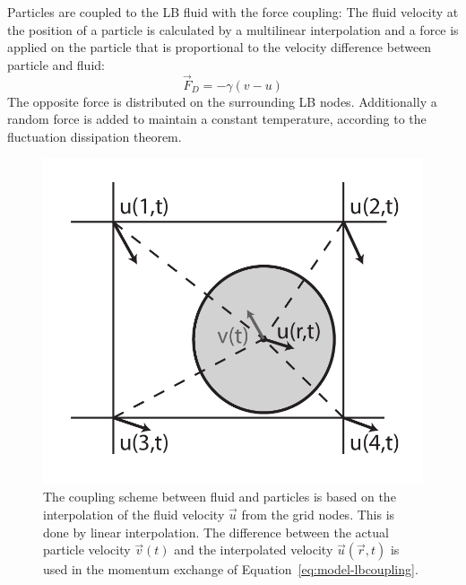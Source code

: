 Particles are coupled to the LB fluid with the force coupling:
The fluid velocity at the position of a particle is calculated 
by a multilinear interpolation and a force is applied on the particle
that is proportional to the velocity difference between particle 
and fluid:
\begin{equation}
  \vec{F}_D = - \gamma \left(v-u\right) 
  \label{eq:model-lbcoupling}
\end{equation}
The opposite force is distributed on the surrounding LB nodes. Additionally
a random force is added to maintain a constant temperature, according
to the fluctuation dissipation theorem. 
\begin{figure}[htp]
\begin{center}
   \includegraphics[height=0.3\textheight]{figures/latticeboltzmann-momentumexchange}
   \caption{The coupling scheme between fluid and particles is based on the
   interpolation of the fluid velocity $\vec{u}$ from the grid nodes.  
   This is done by linear interpolation. The difference between the
   actual particle velocity $\vec{v}(t)$ and the interpolated velocity
   $\vec{u}(\vec{r},t)$ is used in the momentum exchange of
   Equation~\ref{eq:model-lbcoupling}.}
  \label{fig:model-lbcoupling}
\end{center}
\end{figure}
\pagebreak
